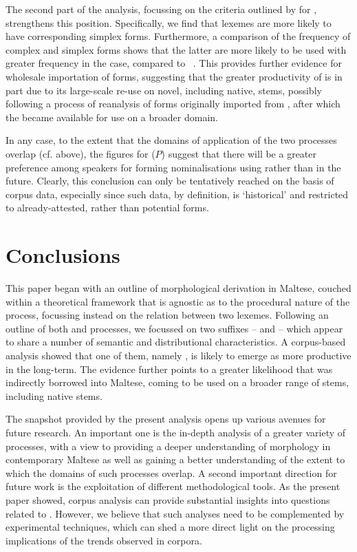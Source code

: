 \documentclass[output=paper]{LSP/langsci}
\begin{document}
The second part of the analysis, focussing on the criteria outlined by \citet{Seifart2015} for , strengthens this position. Specifically, we find that {\ar} lexemes are more likely to have corresponding simplex forms. Furthermore, a comparison of the frequency of complex and simplex forms shows that the latter are more likely to be used with greater frequency in the {\ar} case, compared to \zjoni~. This provides further evidence for wholesale importation of {\zjoni} forms, suggesting that the greater productivity of {\ar} is in part due to its large-scale re-use on novel, including native, stems, possibly following a process of reanalysis of forms originally imported from , after which the  became available for use on a broader domain.

In any case, to the extent that the domains of application of the two  processes overlap (cf.  above), the figures for  ($P$) suggest that there will be a greater preference among speakers for forming nominalisations using {\ar} rather than {\zjoni} in the future. Clearly, this conclusion can only be tentatively reached on the basis of corpus data, especially since such data, by definition, is `historical' and restricted to already-attested, rather than potential forms. 

\section{Conclusions}\label{sec:conc}
This paper began with an outline of morphological derivation in Maltese, couched within a theoretical framework that is agnostic as to the procedural nature of the  process, focussing instead on the relation between two lexemes. Following an outline of both  and   processes, we focussed on two  suffixes -- {\ar} and {\zjoni} -- which appear to share a number of semantic and distributional characteristics. A corpus-based analysis showed that one of them, namely \ar, is likely to emerge as more productive in the long-term. The evidence further points to a greater likelihood that {\ar} was indirectly borrowed into Maltese, coming to be used on a broader range of stems, including native stems.

The snapshot provided by the present analysis opens up various avenues for future research. An important one is the in-depth analysis of a greater variety of  processes, with a view to providing a deeper understanding of  morphology in contemporary Maltese as well as gaining a better understanding of the extent to which the domains of such processes overlap. A second important direction for future work is the exploitation of different methodological tools. As the present paper showed, corpus analysis can provide substantial insights into questions related to . However, we believe that such analyses need to be complemented by experimental techniques, which can shed a more direct light on the processing implications of the trends observed in corpora.
\end{document}

